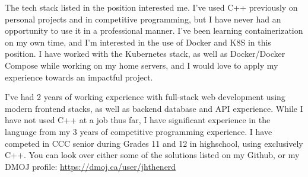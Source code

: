 \documentclass[11pt, letter]{awesome-cv}
\begin{document}
\begin{cvletter}
The tech stack listed in the position interested me.
I've used C++ previously on personal projects and in competitive programming,
but I have never had an opportunity to use it in a professional manner.
I've been learning containerization on my own time, and 
I'm interested in the use of Docker and K8S in this position.
I have worked with the Kubernetes stack, as well as Docker/Docker Compose
while working on my home servers, and I would love to apply my experience
towards an impactful project.

I've had 2 years of working experience with full-stack web development
using modern frontend stacks, as well as backend database and API experience.
While I have not used C++ at a job thus far, 
I have significant experience in the language from my 3 years of competitive programming experience.
I have competed in CCC senior during Grades 11 and 12 in highschool,
using exclusively C++.
You can look over either some of the solutions listed on my Github, 
or my DMOJ profile:
\url{https://dmoj.ca/user/jhthenerd}


\end{cvletter}
\end{document}
